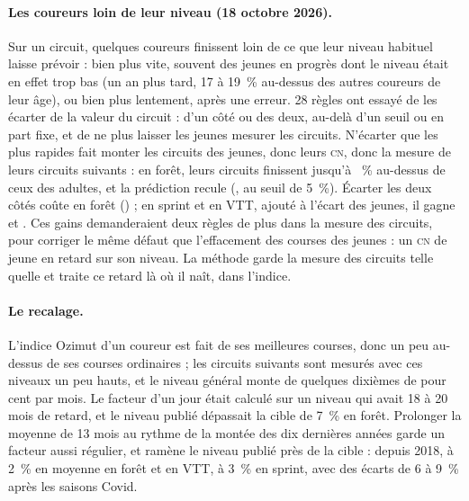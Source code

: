 \documentclass[11pt,a4paper]{article}
\newcommand{\CN}{\textsc{cn}}
\begin{document}
\paragraph{Les coureurs loin de leur niveau (18 octobre 2026).} Sur un circuit, quelques coureurs finissent loin de ce que leur niveau habituel laisse prévoir : bien plus vite, souvent des jeunes en progrès dont le niveau était en effet trop bas (un an plus tard, 17 à 19~\% au-dessus des autres coureurs de leur âge), ou bien plus lentement, après une erreur. 28 règles ont essayé de les écarter de la valeur du circuit : d'un côté ou des deux, au-delà d'un seuil ou en part fixe, et de ne plus laisser les jeunes mesurer les circuits. N'écarter que les plus rapides fait monter les circuits des jeunes, donc leurs \CN, donc la mesure de leurs circuits suivants : en forêt, leurs circuits finissent jusqu'à \NoutLoop~\% au-dessus de ceux des adultes, et la prédiction recule (\NoutFast, \NoutFastFive{} au seuil de 5~\%). Écarter les deux côtés coûte en forêt (\NoutBothF) ; en sprint et en VTT, ajouté à l'écart des jeunes, il gagne \NoutXS{} et \NoutXV. Ces gains demanderaient deux règles de plus dans la mesure des circuits, pour corriger le même défaut que l'effacement des courses des jeunes : un \CN{} de jeune en retard sur son niveau. La méthode garde la mesure des circuits telle quelle et traite ce retard là où il naît, dans l'indice.

\paragraph{Le recalage.} L'indice Ozimut d'un coureur est fait de ses meilleures courses, donc un peu au-dessus de ses courses ordinaires ; les circuits suivants sont mesurés avec ces niveaux un peu hauts, et le niveau général monte de quelques dixièmes de pour cent par mois. Le facteur d'un jour était calculé sur un niveau qui avait 18 à 20 mois de retard, et le niveau publié dépassait la cible de 7~\% en forêt. Prolonger la moyenne de 13 mois au rythme de la montée des dix dernières années garde un facteur aussi régulier, et ramène le niveau publié près de la cible : depuis 2018, à 2~\% en moyenne en forêt et en VTT, à 3~\% en sprint, avec des écarts de 6 à 9~\% après les saisons Covid.
\end{document}
